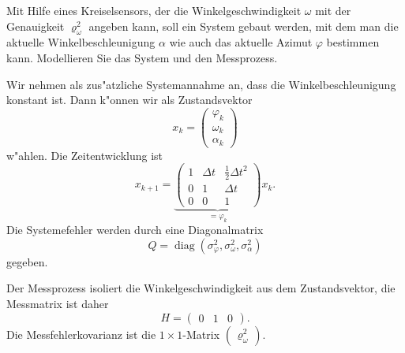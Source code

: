 Mit Hilfe eines Kreiselsensors, der die Winkelgeschwindigkeit $\omega$
mit der Genauigkeit $\varrho_{\omega}^2$ angeben kann, soll ein System gebaut
werden, mit dem man die aktuelle Winkelbeschleunigung $\alpha$ wie auch
das aktuelle Azimut $\varphi$ bestimmen kann.
Modellieren Sie das System und den Messprozess.

\begin{loesung}
Wir nehmen als zus"atzliche Systemannahme an, dass die Winkelbeschleunigung
konstant ist.
Dann k"onnen wir als Zustandsvektor
\[
x_k=\begin{pmatrix}\varphi_k\\\omega_k\\\alpha_k\end{pmatrix}
\]
w"ahlen.
Die Zeitentwicklung ist
\[
x_{k+1}=\underbrace{\begin{pmatrix}
1&\Delta t&\frac12\Delta t^2\\
0&1       &\Delta t\\
0&0       &1
\end{pmatrix}}_{=\varphi_k}x_k.
\]
Die Systemefehler werden durch eine Diagonalmatrix
\[
Q=\operatorname{diag}(\sigma_{\varphi}^2, \sigma_{\omega}^2, \sigma_{\alpha}^2)
\]
gegeben.

Der Messprozess isoliert die Winkelgeschwindigkeit aus dem Zustandsvektor,
die Messmatrix ist daher
\[
H=\begin{pmatrix}
0&1&0
\end{pmatrix}.
\]
Die Messfehlerkovarianz ist die $1\times 1$-Matrix
$\begin{pmatrix}\varrho_\omega^2\end{pmatrix}$.
\end{loesung}


